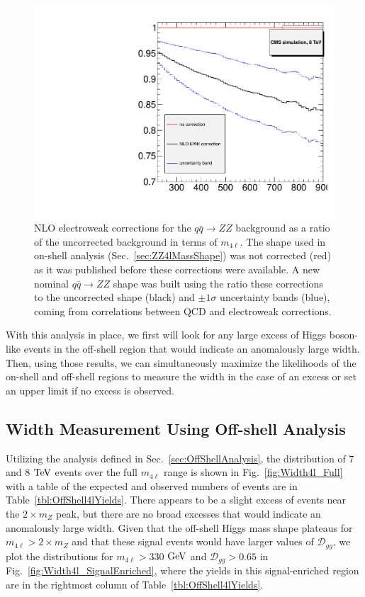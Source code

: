 \begin{figure}[htbp]
\begin{center}
\includegraphics[width=.5\linewidth]{HiggsProperties/figures/EWKcorr_ratio.pdf}
\caption[NLO Electroweak Corrections for $q\bar{q}\rightarrow ZZ$ Background]{NLO electroweak corrections for the $q\bar{q}\rightarrow ZZ$ background as a ratio of the uncorrected background in terms of $m_{4\ell}$. The shape used in on-shell analysis (Sec.~\ref{sec:ZZ4lMassShape}) was not corrected (red) as it was published before these corrections were available. A new nominal $q\bar{q}\rightarrow ZZ$ shape was built using the ratio these corrections to the uncorrected shape (black) and $\pm1\sigma$ uncertainty bands (blue), coming from correlations between QCD and electroweak corrections.}
\label{fig:qqZZEWKCorrections}
\end{center}
\end{figure}

With this analysis in place, we first will look for any large excess of Higgs boson-like events in the off-shell region that would indicate an anomalously large width. Then, using those results, we can simultaneously maximize the likelihoods of the on-shell and off-shell regions to measure the width in the case of an excess or set an upper limit if no excess is observed.

\subsection{Width Measurement Using Off-shell Analysis}
\label{sec:WidthResults}

Utilizing the analysis defined in Sec.~\ref{sec:OffShellAnalysis}, the distribution of $7$ and $8$ $\rm{TeV}$ events over the full $m_{4\ell}$ range is shown in Fig.~\ref{fig:Width4l_Full} with a table of the expected and observed numbers of events are in Table~\ref{tbl:OffShell4lYields}. There appears to be a slight excess of events near the $2\times m_{Z}$ peak, but there are no broad excesses that would indicate an anomalously large width. Given that the off-shell Higgs mass shape plateaus for $m_{4\ell} > 2\times m_{Z}$ and that these signal events would have larger values of $\mathcal{D}_{gg}$, we plot the distributions for $m_{4\ell}>330$ $\rm{GeV}$ and $\mathcal{D}_{gg}>0.65$ in Fig.~\ref{fig:Width4l_SignalEnriched}, where the yields in this signal-enriched region are in the rightmost column of Table~\ref{tbl:OffShell4lYields}.

